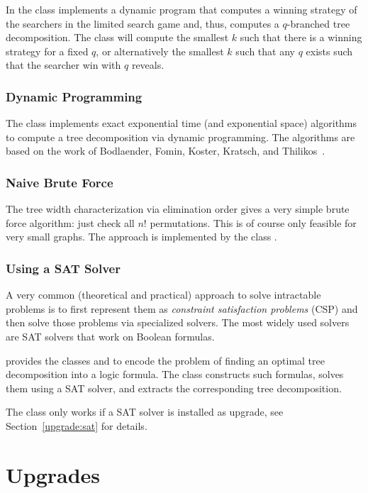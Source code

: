 \documentclass[a4paper, ukenglish, twoside, openright]{jdrasilmanual}
\begin{document}
In \Jdrasil{} the class  implements a
dynamic program that computes a winning strategy of the searchers in
the limited search game and, thus, computes a $q$-branched tree
decomposition. The class will compute the smallest $k$ such that there
is a winning strategy for a fixed $q$, or alternatively the smallest
$k$ such that any $q$ exists such that the searcher win with $q$ reveals.

\section{Dynamic Programming}
The class  implements exact exponential time (and exponential space)
algorithms to compute a tree decomposition via dynamic programming.
The algorithms are based on the work of 
Bodlaender, Fomin, Koster, Kratsch, and Thilikos~\cite{BodlaenderFKKT2012}.

\section{Naive Brute Force}
The tree width characterization via elimination order gives a very
simple brute force algorithm: just check all $n!$ permutations. This
is of course only feasible for very small graphs. The approach is
implemented by the class .

\section{Using a SAT Solver}
A very common (theoretical and practical) approach to solve intractable
problems is to first represent them as \emph{constraint satisfaction
  problems} (CSP) and then solve those problems via specialized solvers. The
most widely used solvers are SAT solvers that work on Boolean
formulas.

\Jdrasil{} provides the classes  and
 to encode the problem of finding an optimal
tree decomposition into a logic formula. The class
 constructs such formulas, solves them using a
SAT solver, and extracts the corresponding tree decomposition.

The class  only works if a SAT solver is
installed as upgrade, see Section~\ref{upgrade:sat} for details.

\part{Upgrades}\label{part:upgrades}
\end{document}
